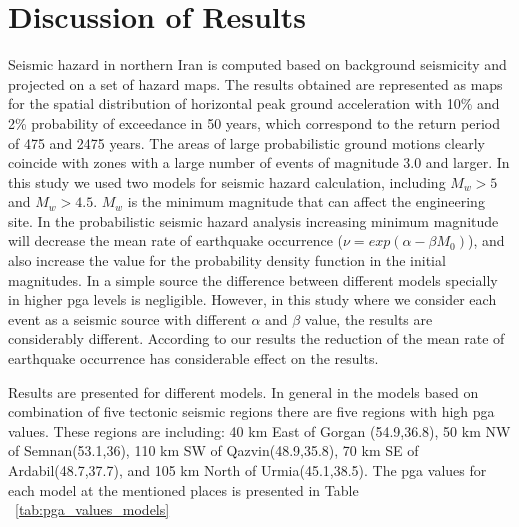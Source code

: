 \section{Discussion of Results}
Seismic hazard in northern Iran is computed based on background seismicity and projected on a set of hazard maps. The results obtained are represented as maps for the spatial distribution of horizontal peak ground acceleration with 10\% and 2\% probability of exceedance in 50 years, which correspond to the return period of 475 and 2475 years. The areas of large probabilistic ground motions clearly coincide with zones with a large number of events of magnitude 3.0 and larger. In this study we used two models for seismic hazard calculation, including $M_w>5$ and $M_w>4.5$. $M_w$ is the minimum magnitude that can affect the engineering site. In the probabilistic seismic hazard analysis increasing minimum magnitude will decrease the mean rate of earthquake occurrence ($\nu=exp(\alpha - \beta M_0)$), and also increase the value for the probability density function in the initial magnitudes. In a simple source the difference between different models specially in higher pga levels is negligible. However, in this study where we consider each event as a seismic source with different $\alpha$ and $\beta$ value, the results are considerably different. According to our results the reduction of the mean rate of earthquake occurrence has considerable effect on the results. 

\noindent
Results are presented for different models. In general in the models based on combination of five tectonic seismic regions there are five regions with high pga values. These regions are including: 40 km East of Gorgan (54.9,36.8), 50 km NW of Semnan(53.1,36), 110 km SW of Qazvin(48.9,35.8), 70 km SE of Ardabil(48.7,37.7), and 105 km North of Urmia(45.1,38.5). The pga values for each model at the mentioned places is presented in Table ~\ref{tab:pga_values_models}


